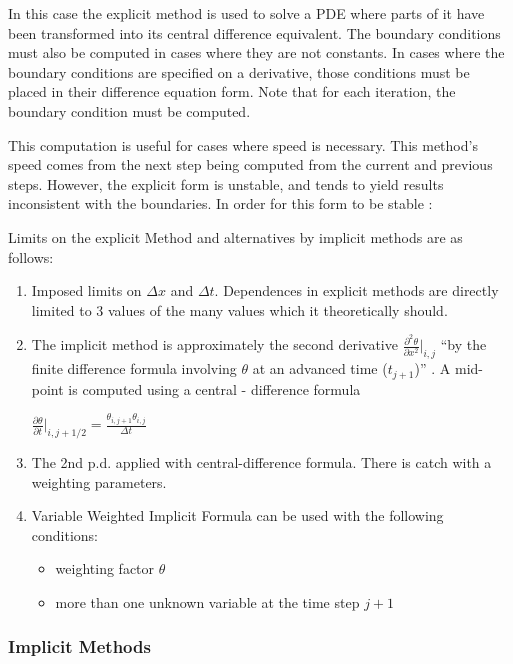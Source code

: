\documentclass[11pt]{article}
\begin{document}
In this case the explicit method is used to solve a PDE where parts of it have been transformed into its central difference equivalent.  The boundary conditions must also be computed in cases where they are not constants.  In cases where the boundary conditions are specified on a derivative, those conditions must be placed in their difference equation form.  Note that for each iteration, the boundary condition must be computed.

This computation is useful for cases where speed is necessary.  This method's speed comes from the next step being computed from the current and previous steps.   However, the %
explicit form is unstable, and tends to yield results inconsistent with the boundaries.   In order for this form to be stable :


Limits on the explicit Method and alternatives by implicit methods are as follows:  
\begin{enumerate}
\item Imposed limits on $\Delta x$ and $\Delta t$.  Dependences in explicit methods are directly limited to 3 values of the many values which it theoretically should.
\item The implicit method is approximately the second derivative $\frac{ \partial ^2 \theta }{\partial x^2} |_{i,j} $ ``by the finite difference formula involving $\theta$ at an advanced time ($t_{j+1}$)''  \cite {appliedmethods}.  A mid-point is computed using a central - difference formula 

	$\frac{\partial \theta}{\partial t} | _{i,j+1/2} = \frac {\theta_{i,j+1}  \theta_{i,j} }{\Delta t}$
	
\item The 2nd p.d. applied with central-difference formula.  There is catch with a weighting parameters.  
\item Variable Weighted Implicit Formula can be used with the following conditions:
\begin{itemize}
\item weighting factor $\theta$
\item more than one unknown variable at the time step $ j+1$
\end{itemize}

\end{enumerate}

\subsubsection{Implicit Methods}
\end{document}
